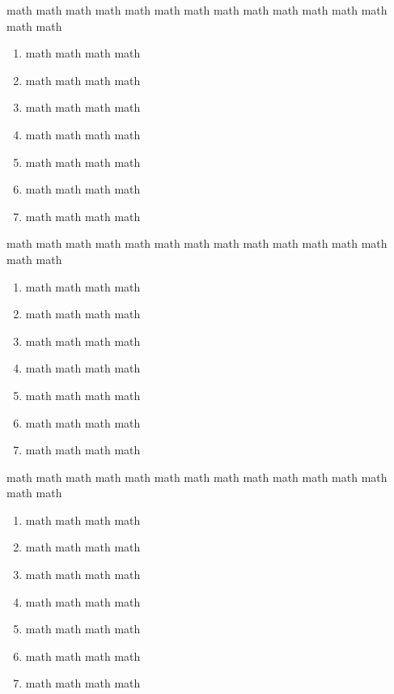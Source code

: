 \documentclass[12pt,a4paper]{article}
\begin{document}
\begin{multicols}{2}
\begin{Exercice}
\begin{enumerate}[label=\textbf{\color{gris}\arabic*.}]
\end{enumerate}
\end{Exercice}

\begin{Exercice}math math math math math math math math math math math math math math math
\begin{enumerate}[label=\textbf{\color{gris}\arabic*.}]
    \item math math math math
    \item math math math math
    \item math math math math
    \item math math math math
    \item math math math math
    \item math math math math
    \item math math math math
\end{enumerate}
\end{Exercice}
\begin{Exercice}math math math math math math math math math math math math math math math
\begin{enumerate}[label=\textbf{\color{gris}\arabic*.}]
    \item math math math math
    \item math math math math
    \item math math math math
    \item math math math math
    \item math math math math
    \item math math math math
    \item math math math math
\end{enumerate}
\end{Exercice}
\begin{Exercice}math math math math math math math math math math math math math math math
\begin{enumerate}[label=\textbf{\color{gris}\arabic*.}]
    \item math math math math
    \item math math math math
    \item math math math math
    \item math math math math
    \item math math math math
    \item math math math math
    \item math math math math
\end{enumerate}
\end{Exercice}

\end{multicols}
\end{document}

